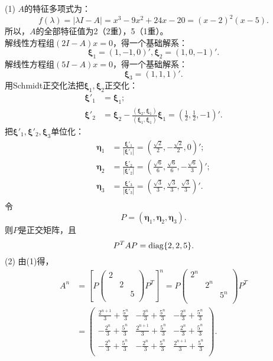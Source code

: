 \begin{enumerate}[1~]
\begin{solution}
(1) $A$的特征多项式为：\[
f(\lambda)=|\lambda I-A|=x^3-9 x^2+24 x-20= (x-2)^2 (x-5).
\]
所以，$A$的全部特征值为2（2重），5（1重）。\\
解线性方程组$(2I-A)x=0$，得一个基础解系：\[
\boldsymbol{\xi}_1=(1, -1, 0)', \boldsymbol{\xi}_2=(1, 0, -1)'.
\]
解线性方程组$(5I-A)x=0$，得一个基础解系：\[
\boldsymbol{\xi}_3=(1, 1, 1)'.
\]
用Schmidt正交化法把$\boldsymbol{\xi}_1, \boldsymbol{\xi}_2$正交化：\begin{align*}
\boldsymbol{\xi}'_1&=\boldsymbol{\xi}_1;\\
\boldsymbol{\xi}'_2&=\boldsymbol{\xi}_2-\frac{(\boldsymbol{\xi}_2, \boldsymbol{\xi}_1)}{(\boldsymbol{\xi}_1, \boldsymbol{\xi}_1)}\boldsymbol{\xi}_1=\left(\frac12, \frac12, -1\right)'.
\end{align*}
把$\boldsymbol{\xi}'_1, \boldsymbol{\xi}'_2, \boldsymbol{\xi}_3$单位化：\begin{align*}
\boldsymbol{\eta}_1&=\frac{\boldsymbol{\xi}'_1}{|\boldsymbol{\xi}'_1|}=\left(\frac{\sqrt{2}}{2}, -\frac{\sqrt{2}}{2}, 0\right)';\\
\boldsymbol{\eta}_2&=\frac{\boldsymbol{\xi}'_2}{|\boldsymbol{\xi}'_2|}=\left(\frac{\sqrt{6}}{6}, \frac{\sqrt{6}}{6}, -\frac{\sqrt{6}}{3}\right)';\\
\boldsymbol{\eta}_3&=\frac{\boldsymbol{\xi}'_3}{|\boldsymbol{\xi}'_3|}=\left(\frac{\sqrt{3}}{3}, \frac{\sqrt{3}}{3}, \frac{\sqrt{3}}{3}\right)'.\\
\end{align*}
令\[
P=(\boldsymbol{\eta}_1, \boldsymbol{\eta}_2, \boldsymbol{\eta}_3).
\]
则$P$是正交矩阵，且\[
P^T A P={\rm diag}\{2, 2, 5\}.
\]
(2) 由(1)得，\begin{align*}
A^n&=\left[P\left( \begin{matrix}
	2&		&		\\
	&		2&		\\
	&		&		5\\
\end{matrix} \right) P^T\right]^n=P\left( \begin{matrix}
	2^n&		&		\\
	&		2^n&		\\
	&		&		5^n\\
\end{matrix} \right) P^T\\
&=\left(
\begin{array}{ccc}
 \frac{2^{n+1}}{3}+\frac{5^n}{3} & -\frac{2^n}{3}+\frac{5^n}{3} & -\frac{2^n}{3}+\frac{5^n}{3} \\
 -\frac{2^n}{3}+\frac{5^n}{3} & \frac{2^{n+1}}{3}+\frac{5^n}{3} & -\frac{2^n}{3}+\frac{5^n}{3} \\
 -\frac{2^n}{3}+\frac{5^n}{3} & -\frac{2^n}{3}+\frac{5^n}{3} & \frac{2^{n+1}}{3}+\frac{5^n}{3} \\
\end{array}
\right).
\end{align*}
\end{solution}


\end{enumerate}
